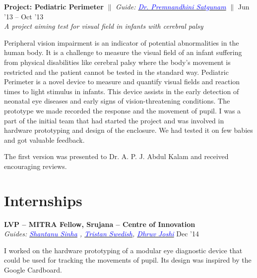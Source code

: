 \documentclass[margin,line]{res}
\newenvironment{list1}{
  \begin{list}{\ding{113}}{%
      \setlength{\itemsep}{0in}
      \setlength{\parsep}{0in} \setlength{\parskip}{0in}
      \setlength{\topsep}{0in} \setlength{\partopsep}{0in} 
      \setlength{\leftmargin}{0.17in}}}{\end{list}}
\begin{document}
\begin{resume}
\begin{list1}
\item[]\textbf{Project: Pediatric Perimeter} \hfill $\|$ \hfill {\em Guide: \href{http://www.lvpei.org/our-team/our-team-Premnandhini.php}{\textcolor{blue} {Dr. Premnandhini Satgunam}}} \hfill $\|$ \hfill {Jun '13 -- Oct '13} \\
\textit{A project aiming test for visual field in infants with cerebral palsy} 
\vspace{4pt}

\noindent Peripheral vision impairment is an indicator of potential abnormalities in the human body. It is a challenge to measure the visual field of an infant suffering from physical disabilities like cerebral palsy where the body's movement is restricted and the patient cannot be tested in the standard way. Pediatric Perimeter is a novel device to measure and quantify visual fields and reaction times to light stimulus in infants. This device assists in the early detection of neonatal eye diseases and early signs of vision-threatening conditions. 
The prototype we made recorded the response and the movement of pupil. I was a part of the initial team that had started the project and was involved in hardware prototyping and design of the enclosure. We had tested it on few babies and got valuable feedback. 

\noindent The first version was presented to Dr. A. P. J. Abdul Kalam and received encouraging reviews. 
\end{list1}

\section{\sc Internships}

{\bf LVP -- MITRA Fellow, Srujana -- Centre of Innovation} \hfill  \\
{\em Guides: \href{https://www.media.mit.edu/~sssinha}{\textcolor{blue}{Shantanu Sinha}} , \href{https://web.media.mit.edu/~tswedish/}{\textcolor{blue}{Tristan Swedish}}, \href{https://www.linkedin.com/in/derbedhruv}{\textcolor{blue}{Dhruv Joshi}}} \hfill {Dec '14} \\
\vspace*{-.13in}
\begin{list1}
\item[]
I worked on the hardware prototyping of a modular eye diagnostic device that could be used for tracking the movements of pupil. Its design was inspired by the Google Cardboard. 
\end{list1}


\end{resume}
\end{document}
